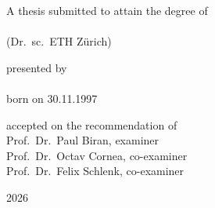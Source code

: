 \begin{titlepage}
    \begin{center}
        \large
        \begingroup
        \endgroup

        \hfill

        \vfill

        \begingroup
        \endgroup

        \vfill

        \begingroup
            A thesis submitted to attain the degree of\\
            \vspace{0.5em}
            \\
            (Dr.\ sc.\ ETH Z\"urich)
        \endgroup

        \vfill

        \begingroup
            presented by\\
            \vspace{0.5em}
            \\
            \vspace{0.5em}
            born on 30.11.1997
        \endgroup

        \vfill

        \begingroup
            accepted on the recommendation of\\
            \vspace{0.5em}
            Prof.\ Dr.\ Paul Biran, examiner\\
            Prof.\ Dr.\ Octav Cornea, co-examiner\\
            Prof.\ Dr.\ Felix Schlenk, co-examiner
        \endgroup

        \vfill

        2026

        \vfill
    \end{center}
\end{titlepage}